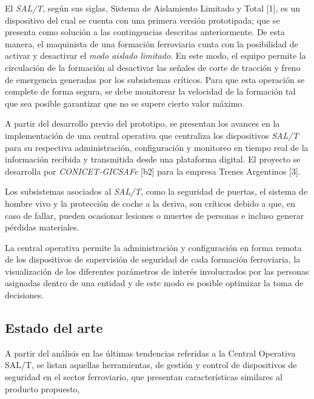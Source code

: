 El \textit{SAL/T}, según sus siglas, Sistema de Aislamiento Limitado y Total [1], es un dispositivo del cual se cuenta con una primera versión prototipada; que se presenta como solución a las contingencias descritas anteriormente. De esta manera, el maquinista de una formación ferroviaria cunta con la posibilidad de activar y desactivar el \textit{modo aislado limitado}. En este modo, el equipo permite la circulación de la formación al desactivar las señales de corte de tracción y freno de emergencia generadas por los subsistemas críticos. Para que esta operación se complete de forma segura, se debe monitorear la velocidad de la formación tal que sea posible garantizar que no se supere cierto valor máximo.

A partir del desarrollo previo del prototipo, se presentan los avances en la implementación de una central operativa que centraliza los dispositivos \textit{SAL/T} para su respectiva administración, configuración y monitoreo en tiempo real de la información recibida y transmitida desde una plataforma digital. El proyecto se desarrolla por \textit{CONICET-GICSAFe} [b2] para la empresa Trenes Argentinos [3].

Los subsistemas asociados al \textit{SAL/T}, como la seguridad de puertas, el sistema de hombre vivo y la protección de coche a la deriva, son críticos debido a que, en caso de fallar, pueden ocasionar lesiones o muertes de personas e incluso generar pérdidas materiales. 

La central operativa permite la administración y configuración en forma remota de los dispositivos de supervisión de seguridad de cada formación ferroviaria, la visualización de los diferentes parámetros de interés involucrados por las personas asignadas dentro de una entidad y de este modo es posible optimizar la toma de decisiones. 


\newpage
\subsection{Estado del arte}

A partir del análisis en las últimas tendencias referidas a la Central Operativa SAL/T, se listan aquellas herramientas, de gestión y control de dispositivos de seguridad en el sector ferroviario, que presentan características similares al producto propuesto,

